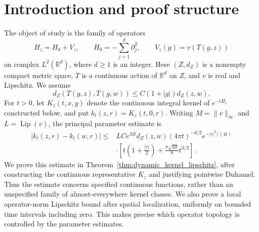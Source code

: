 \tableofcontents
\chapter*{Introduction and proof structure}
The object of study is the family of operators
\[
H_z=H_0+V_z,\qquad
H_0=-\sum_{j=1}^d\partial_j^2,\qquad
V_z(g)=v(T(g,z))
\]
on complex $L^2(\mathbb R^d)$, where $d\geq1$ is an integer.
Here $(Z,d_Z)$ is a nonempty compact metric space,
$T$ is a continuous action of $\mathbb R^d$ on $Z$, and $v$ is real
and Lipschitz. We assume
\[
d_Z(T(g,z),T(g,w))\leq C(1+|g|)d_Z(z,w).
\]
For $t>0$, let $K_z(t,x,y)$ denote the continuous integral kernel of
$e^{-tH_z}$ constructed below, and put $k_t(z,r)=K_z(t,0,r)$.
Writing $M=\|v\|_\infty$ and $L=\operatorname{Lip}(v)$, the principal
parameter estimate is
\[
\begin{split}
|k_t(z,r)-k_t(w,r)|
\leq{}&LCe^{Mt}d_Z(z,w)(4\pi t)^{-d/2}e^{-|r|^2/(4t)}\\
&\cdot\left[t\left(1+\frac{|r|}{2}\right)
                  +\frac{\pi\sqrt{2d}}8t^{3/2}\right].
\end{split}
\]
We prove this estimate
in Theorem~\ref{thm:dynamic_kernel_lipschitz}, after constructing the
continuous representative $K_z$ and justifying pointwise Duhamel.
Thus the estimate concerns specified continuous functions, rather than
an unspecified family of almost-everywhere kernel classes. We also
prove a local operator-norm Lipschitz bound after spatial localization,
uniformly on bounded time intervals including zero. This makes precise
which operator topology is controlled by the parameter estimates.

